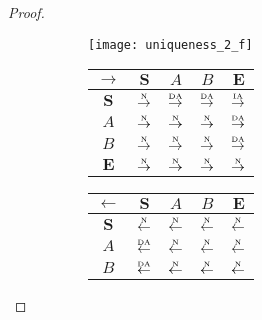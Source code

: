 \begin{proof}
\begin{figure}[htbp]
  \begin{subfigure}{1\textwidth}
    \vspace{1em}
    \centering
    \begin{minipage}[b]{1\textwidth}
      \centering
      \texttt{[image: uniqueness\_2\_f]}
    \end{minipage}
    \begin{minipage}[b]{0.3\textwidth}
      \vspace{1em}
      \centering
      \begin{tabular}{|c|c|c|c|c|} \hline
        $\rightarrow$ & $\bm{S}$ & $A$ & $B$ & $\bm{E}$\\ \hline
        $\bm{S}$ & $\overset{\text{\tiny{N}}}{\rightarrow}$ & $\overset{\text{\tiny{DA}}}{\rightarrow}$ & $\overset{\text{\tiny{DA}}}{\rightarrow}$ & $\overset{\text{\tiny{IA}}}{\rightarrow}$\\ \hline
        $A$ & $\overset{\text{\tiny{N}}}{\rightarrow}$ & $\overset{\text{\tiny{N}}}{\rightarrow}$ & $\overset{\text{\tiny{N}}}{\rightarrow}$ & $\overset{\text{\tiny{DA}}}{\rightarrow}$\\ \hline
        $B$ & $\overset{\text{\tiny{N}}}{\rightarrow}$ & $\overset{\text{\tiny{N}}}{\rightarrow}$ & $\overset{\text{\tiny{N}}}{\rightarrow}$ & $\overset{\text{\tiny{DA}}}{\rightarrow}$\\ \hline
        $\bm{E}$ & $\overset{\text{\tiny{N}}}{\rightarrow}$ & $\overset{\text{\tiny{N}}}{\rightarrow}$ & $\overset{\text{\tiny{N}}}{\rightarrow}$ & $\overset{\text{\tiny{N}}}{\rightarrow}$\\ \hline
      \end{tabular}
    \end{minipage}
    \begin{minipage}[b]{0.3\textwidth}
      \vspace{1em}
      \centering
      \begin{tabular}{|c|c|c|c|c|} \hline
        $\leftarrow$ & $\bm{S}$ & $A$ & $B$ & $\bm{E}$\\ \hline
        $\bm{S}$ & $\overset{\text{\tiny{N}}}{\leftarrow}$ & $\overset{\text{\tiny{N}}}{\leftarrow}$ & $\overset{\text{\tiny{N}}}{\leftarrow}$ & $\overset{\text{\tiny{N}}}{\leftarrow}$\\ \hline
        $A$ & $\overset{\text{\tiny{DA}}}{\leftarrow}$ & $\overset{\text{\tiny{N}}}{\leftarrow}$ & $\overset{\text{\tiny{N}}}{\leftarrow}$ & $\overset{\text{\tiny{N}}}{\leftarrow}$\\ \hline
        $B$ & $\overset{\text{\tiny{DA}}}{\leftarrow}$ & $\overset{\text{\tiny{N}}}{\leftarrow}$ & $\overset{\text{\tiny{N}}}{\leftarrow}$ & $\overset{\text{\tiny{N}}}{\leftarrow}$\\ \hline

\end{tabular}
\end{minipage}
\end{subfigure}
\end{figure}
\end{proof}

